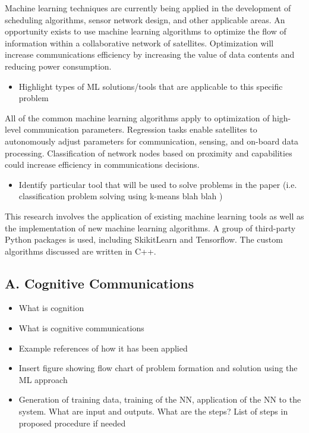 \documentclass[11pt]{article}
\begin{document}
Machine learning techniques are currently being applied in the development of
scheduling algorithms, sensor network design, and other applicable areas.  An
opportunity exists to use machine learning algorithms to optimize the flow of
information within a collaborative network of satellites.  Optimization will
increase communications efficiency by increasing the value of data contents and
reducing power consumption.

\begin{itemize}
\item Highlight types of ML solutions/tools that are applicable to this specific
problem
\end{itemize}

All of the common machine learning algorithms apply to optimization of
high-level communication parameters.  Regression tasks enable satellites to
autonomously adjust parameters for communication, sensing, and on-board data
processing.  Classification of network nodes based on proximity and capabilities
could increase efficiency in communications decisions.

\begin{itemize}
\item Identify particular tool that will be used to solve problems in the paper
(i.e. classification problem solving using k-means blah blah )
\end{itemize}

This research involves the application of existing machine learning tools as
well as the implementation of new machine learning algorithms.  A group of
third-party Python packages is used, including SkikitLearn and Tensorflow.
The custom algorithms discussed are written in C++.

\subsection*{A. Cognitive Communications}
\label{sec:org3c4593b}

\begin{itemize}
\item What is cognition

\item What is cognitive communications

\item Example references of how it has been applied

\item Insert figure showing flow chart of problem formation and solution using the
ML approach

\item Generation of training data, training of the NN, application of the NN to the
system. What are input and outputs. What are the steps? List of steps in
proposed procedure if needed
\end{itemize}
\end{document}
